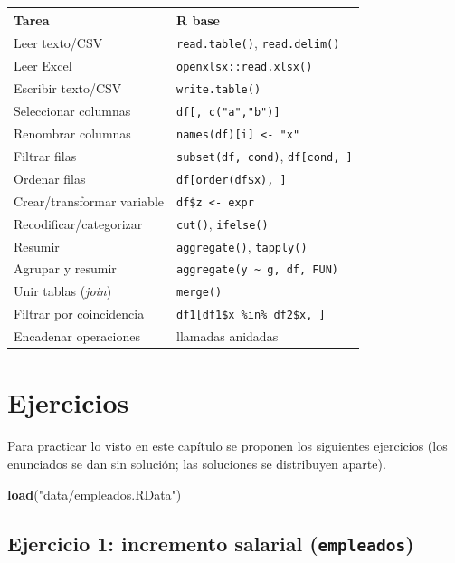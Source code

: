 \documentclass[
]{book}
\newenvironment{Shaded}{\begin{snugshade}}{\end{snugshade}}
\newcommand{\FunctionTok}[1]{\textcolor[rgb]{0.13,0.29,0.53}{\textbf{#1}}}
\newcommand{\NormalTok}[1]{#1}
\newcommand{\StringTok}[1]{\textcolor[rgb]{0.31,0.60,0.02}{#1}}
\newcounter{none} %
\theoremstyle{break}
\theoremstyle{nonumberplain}
\begin{document}
{\def\LTcaptype{none} %
\begin{longtable}[]{@{}ll@{}}
\toprule\noalign{}
Tarea & R base \\
\midrule\noalign{}
\endhead
\bottomrule\noalign{}
\endlastfoot
Leer texto/CSV & \texttt{read.table()}, \texttt{read.delim()} \\
Leer Excel & \texttt{openxlsx::read.xlsx()} \\
Escribir texto/CSV & \texttt{write.table()} \\
Seleccionar columnas & \texttt{df{[},\ c("a","b"){]}} \\
Renombrar columnas & \texttt{names(df){[}i{]}\ \textless{}-\ "x"} \\
Filtrar filas & \texttt{subset(df,\ cond)}, \texttt{df{[}cond,\ {]}} \\
Ordenar filas & \texttt{df{[}order(df\$x),\ {]}} \\
Crear/transformar variable & \texttt{df\$z\ \textless{}-\ expr} \\
Recodificar/categorizar & \texttt{cut()}, \texttt{ifelse()} \\
Resumir & \texttt{aggregate()}, \texttt{tapply()} \\
Agrupar y resumir & \texttt{aggregate(y\ \textasciitilde{}\ g,\ df,\ FUN)} \\
Unir tablas (\emph{join}) & \texttt{merge()} \\
Filtrar por coincidencia & \texttt{df1{[}df1\$x\ \%in\%\ df2\$x,\ {]}} \\
Encadenar operaciones & llamadas anidadas \\
\end{longtable}
}

\section{Ejercicios}\label{ejercicios-manipR}

Para practicar lo visto en este capítulo se proponen los siguientes
ejercicios (los enunciados se dan sin solución; las soluciones se
distribuyen aparte).

\begin{Shaded}
\begin{Highlighting}[]
\FunctionTok{load}\NormalTok{(}\StringTok{"data/empleados.RData"}\NormalTok{)}
\end{Highlighting}
\end{Shaded}

\subsection{\texorpdfstring{Ejercicio 1: incremento salarial (\texttt{empleados})}{Ejercicio 1: incremento salarial (empleados)}}\label{ejercicio-1-incremento-salarial-empleados}
\end{document}
